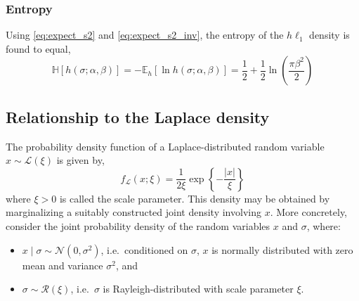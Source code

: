 \documentclass{article}
\newcommand{\E}[2]{\mathbb{E}_{#2}\left[ #1 \right]}
\begin{document}
\subsubsection{Entropy}
Using \eqref{eq:expect_s2} and \eqref{eq:expect_s2_inv}, the entropy
of the $h\ell_1$ density is found to equal,
\begin{equation}
\mathbb{H}[h(\sigma; \alpha, \beta)] =
 -\E{\ln h(\sigma; \alpha, \beta)}{h} =
 \frac{1}{2} + \frac{1}{2} \ln\left( \frac{\pi \beta^2}{2} \right)
\label{eq:hprior_entropy}
\end{equation}

\subsection{Relationship to the Laplace density}
The probability density function of a Laplace-distributed random variable
$x \sim \mathcal{L}(\xi)$ is given by,
\begin{equation}
f_{\mathcal{L}}(x; \xi) =
 \frac{1}{2 \xi} \exp\left\{
  -\frac{|x|}{\xi}
 \right\}
\label{eq:laplace_pdf}
\end{equation}
where $\xi > 0$ is called the scale parameter. This density may be
obtained by marginalizing a suitably constructed joint density
involving $x$. More concretely, consider the joint probability
density of the random variables $x$ and $\sigma$, where:
\begin{itemize}
 \item $x \mid \sigma \sim \mathcal{N}(0, \sigma^2)$, i.e.\
  conditioned on $\sigma$, $x$ is normally distributed with
  zero mean and variance $\sigma^2$, and
 \item $\sigma \sim \mathcal{R}(\xi)$, i.e.\
  $\sigma$ is Rayleigh-distributed with scale parameter $\xi$.
\end{itemize}
\end{document}
